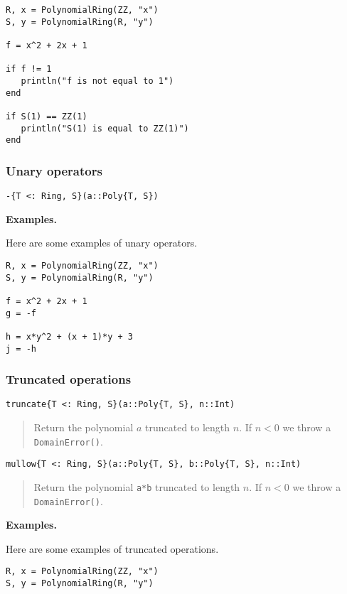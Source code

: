 \documentclass[a4paper,10pt]{article}
\newcommand{\code}{\lstinline}
\newcommand{\desc}[1]{\vspace{-3mm}\begin{quote}#1\end{quote}}
\begin{document}
{{{\begin{lstlisting}
R, x = PolynomialRing(ZZ, "x")
S, y = PolynomialRing(R, "y")

f = x^2 + 2x + 1

if f != 1
   println("f is not equal to 1")
end

if S(1) == ZZ(1)
   println("S(1) is equal to ZZ(1)")
end
\end{lstlisting}

\subsubsection{Unary operators}

\begin{lstlisting}
-{T <: Ring, S}(a::Poly{T, S})
\end{lstlisting}

\textbf{Examples.}

Here are some examples of unary operators.

\begin{lstlisting}
R, x = PolynomialRing(ZZ, "x")
S, y = PolynomialRing(R, "y")

f = x^2 + 2x + 1
g = -f

h = x*y^2 + (x + 1)*y + 3
j = -h
\end{lstlisting}

\subsubsection{Truncated operations}

\begin{lstlisting}
truncate{T <: Ring, S}(a::Poly{T, S}, n::Int)
\end{lstlisting}

\desc{Return the polynomial $a$ truncated to length $n$. If $n < 0$ we throw a
\code{DomainError()}.}

\begin{lstlisting}
mullow{T <: Ring, S}(a::Poly{T, S}, b::Poly{T, S}, n::Int)
\end{lstlisting}

\desc{Return the polynomial \code{a*b} truncated to length $n$. If $n < 0$ we
throw a \code{DomainError()}.}

\textbf{Examples.}

Here are some examples of truncated operations.

\begin{lstlisting}
R, x = PolynomialRing(ZZ, "x")
S, y = PolynomialRing(R, "y")


\end{lstlisting}}}}
\end{document}
